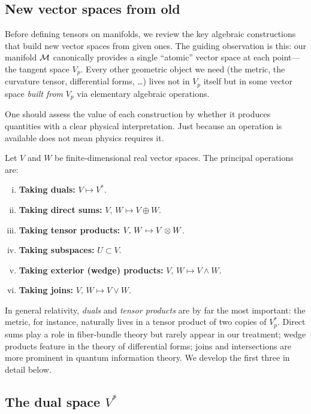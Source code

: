 \subsection{New vector spaces from old}\label{sec:new-spaces}

Before defining tensors on manifolds, we review the key algebraic
constructions that build new vector spaces from given ones.  The
guiding observation is this: our manifold $\mathcal{M}$ canonically provides
a single ``atomic'' vector space at each point---the tangent space
$V_p$.  Every other geometric object we need (the metric, the
curvature tensor, differential forms, \ldots) lives not in $V_p$
itself but in some vector space \emph{built from} $V_p$ via
elementary algebraic operations.

One should assess the value of each construction by whether it
produces quantities with a clear physical interpretation.  Just
because an operation is available does not mean physics requires it.

Let $V$ and $W$ be finite-dimensional real vector spaces.  The
principal operations are:

\begin{enumerate}[(i)]
  \item \textbf{Taking duals:} $V \mapsto V^*$.
  \item \textbf{Taking direct sums:} $V,\, W \mapsto V\oplus W$.
  \item \textbf{Taking tensor products:} $V,\, W \mapsto V\otimes W$.
  \item \textbf{Taking subspaces:} $U\subset V$.
  \item \textbf{Taking exterior (wedge) products:}
    $V,\, W \mapsto V\wedge W$.
  \item \textbf{Taking joins:} $V,\, W \mapsto V\vee W$.
\end{enumerate}

\noindent
In general relativity, \emph{duals} and \emph{tensor products} are
by far the most important: the metric, for instance, naturally
lives in a tensor product of two copies of $V_p^*$.  Direct sums
play a role in fiber-bundle theory but rarely appear in our
treatment; wedge products feature in the theory of differential
forms; joins and intersections are more prominent in quantum
information theory.  We develop the first three in detail below.

\subsection{The dual space $V^*$}\label{sec:dual-space}

